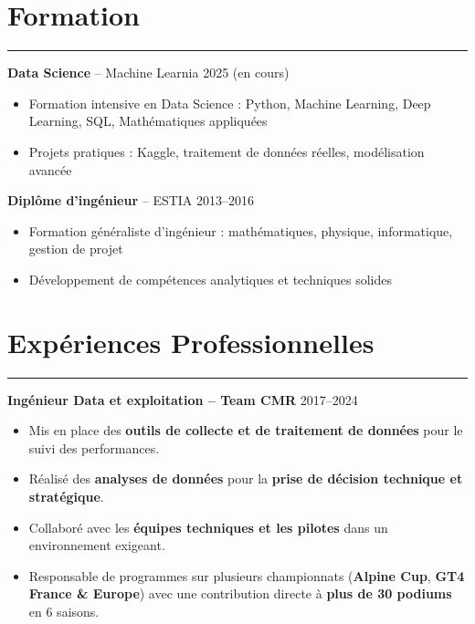 \documentclass[a4paper,12pt]{article}
\newcommand{\sectionrule}[1]{%
  \section*{#1}%
  \vspace{-1em}%
  {\color{bleufonce}\noindent\rule{\linewidth}{1pt}}%
  \vspace{0.5em}%
}
\begin{document}
\begin{paracol}{2}
\begin{rightcolumn}
\begin{minipage}[t][\dimexpr\textheight - 9em\relax][t]{\dimexpr\linewidth - 1.5em\relax}
{\sectionrule{Formation}
\textbf{Data Science} – Machine Learnia \hfill {\color{blue}2025 (en cours)}
\begin{itemize}[leftmargin=1em, nosep]
  \vspace{0.2em}
  \item Formation intensive en Data Science : Python, Machine Learning, Deep Learning, SQL, Mathématiques appliquées
  \vspace{0.2em}
  \item Projets pratiques : Kaggle, traitement de données réelles, modélisation avancée
\end{itemize}

\vspace{0.5em}
\textbf{Diplôme d'ingénieur} – ESTIA \hfill {\color{blue}2013–2016}
\begin{itemize}[leftmargin=1em, nosep]
  \vspace{0.2em}
  \item Formation généraliste d’ingénieur : mathématiques, physique, informatique, gestion de projet
  \vspace{0.2em}
  \item Développement de compétences analytiques et techniques solides
\end{itemize}

\sectionrule{Expériences Professionnelles}

\textbf{Ingénieur Data et exploitation – Team CMR} \hfill {\color{blue}2017–2024}  
\begin{itemize}[leftmargin=1em, nosep]
  \vspace{0.2em}
  \item Mis en place des \textbf{outils de collecte et de traitement de données} pour le suivi des performances.
  \vspace{0.2em}
  \item Réalisé des \textbf{analyses de données} pour la \textbf{prise de décision technique et stratégique}.
  \vspace{0.2em}
  \item Collaboré avec les \textbf{équipes techniques et les pilotes} dans un environnement exigeant.
  \vspace{0.2em}
  \item Responsable de programmes sur plusieurs championnats (\textbf{Alpine Cup}, \textbf{GT4 France \& Europe}) avec une contribution directe à \textbf{plus de 30 podiums} en 6 saisons.
\end{itemize}

}
\end{minipage}
\end{rightcolumn}
\end{paracol}
\end{document}
